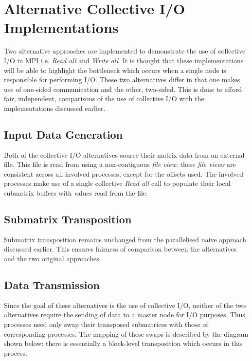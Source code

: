 \documentclass[journal,10pt,a4paper]{IEEEtran}
\begin{document}
\section{Alternative Collective I/O Implementations}

Two alternative approaches are implemented to demonstrate the use of collective I/O in MPI \cite{io,io2} i.e. \textit{Read all} and \textit{Write all}. It is thought that these implementations will be able to highlight the bottleneck which occurs when a single node is responsible for performing I/O. These two alternatives differ in that one makes use of one-sided communication and the other, two-sided. This is done to afford fair, independent, comparisons of the use of collective I/O with the implementations discussed earlier.

\subsection{Input Data Generation}

Both of the collective I/O alternatives source their matrix data from an external file. This file is read from using a non-contiguous \textit{file view}: these \textit{file views} are consistent across all involved processes, except for the offsets used. The involved processes make use of a single collective \textit{Read all} call to populate their local submatrix buffers with values read from the file. 



\subsection{Submatrix Transposition}
Submatrix transposition remains unchanged from the parallelised naive approach discussed earlier. This ensures fairness of comparison between the alternatives and the two original approaches.

\subsection{Data Transmission}

Since the goal of these alternatives is the use of collective I/O, neither of the two alternatives require the sending of data to a master node for I/O purposes. Thus, processes need only swap their transposed submatrices with those of corresponding processes. The mapping of these swaps is described by the diagram shown below: there is essentially a block-level transposition which occurs in this process.
\end{document}
